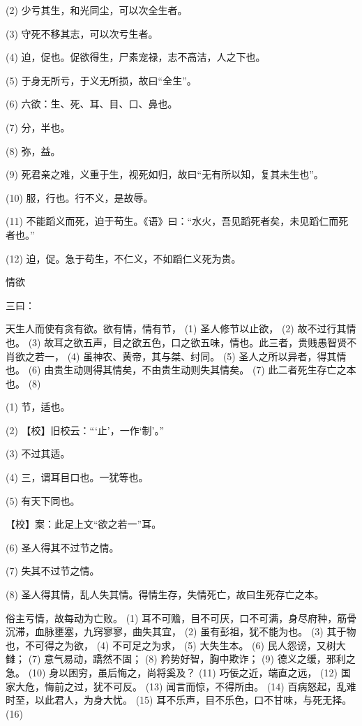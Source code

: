 \documentclass[12pt,UTF8]{ctexbook}
\begin{document}
(2) 少亏其生，和光同尘，可以次全生者。

(3) 守死不移其志，可以次亏生者。

(4) 迫，促也。促欲得生，尸素宠禄，志不高洁，人之下也。

(5) 于身无所亏，于义无所损，故曰“全生”。

(6) 六欲：生、死、耳、目、口、鼻也。

(7) 分，半也。

(8) 弥，益。

(9) 死君亲之难，义重于生，视死如归，故曰“无有所以知，复其未生也”。

(10) 服，行也。行不义，是故辱。

(11) 不能蹈义而死，迫于苟生。《语》曰：“水火，吾见蹈死者矣，未见蹈仁而死者也。”

(12) 迫，促。急于苟生，不仁义，不如蹈仁义死为贵。





情欲


三曰：

天生人而使有贪有欲。欲有情，情有节， (1) 圣人修节以止欲， (2) 故不过行其情也。 (3) 故耳之欲五声，目之欲五色，口之欲五味，情也。此三者，贵贱愚智贤不肖欲之若一， (4) 虽神农、黄帝，其与桀、纣同。 (5) 圣人之所以异者，得其情也。 (6) 由贵生动则得其情矣，不由贵生动则失其情矣。 (7) 此二者死生存亡之本也。 (8)

(1) 节，适也。

(2) 【校】旧校云：“‘止’，一作‘制’。”

(3) 不过其适。

(4) 三，谓耳目口也。一犹等也。

(5) 有天下同也。

【校】案：此足上文“欲之若一”耳。

(6) 圣人得其不过节之情。

(7) 失其不过节之情。

(8) 圣人得其情，乱人失其情。得情生存，失情死亡，故曰生死存亡之本。

俗主亏情，故每动为亡败。 (1) 耳不可赡，目不可厌，口不可满，身尽府种，筋骨沉滞，血脉壅塞，九窍寥寥，曲失其宜， (2) 虽有彭祖，犹不能为也。 (3) 其于物也，不可得之为欲， (4) 不可足之为求， (5) 大失生本。 (6) 民人怨谤，又树大雠； (7) 意气易动，蹻然不固； (8) 矜势好智，胸中欺诈； (9) 德义之缓，邪利之急。 (10) 身以困穷，虽后悔之，尚将奚及？ (11) 巧佞之近，端直之远， (12) 国家大危，悔前之过，犹不可反。 (13) 闻言而惊，不得所由。 (14) 百病怒起，乱难时至，以此君人，为身大忧。 (15) 耳不乐声，目不乐色，口不甘味，与死无择。 (16)
\end{document}
